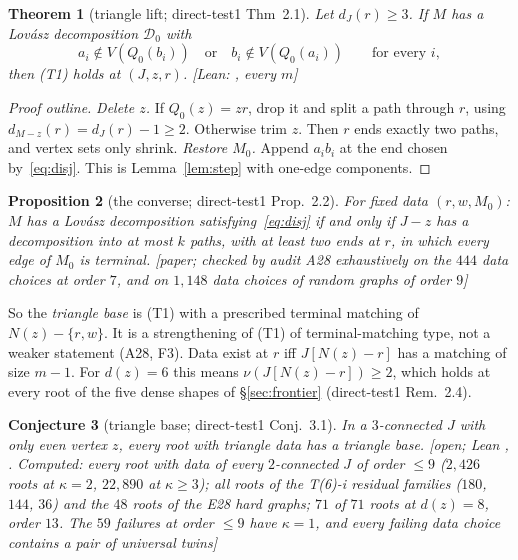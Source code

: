 \documentclass[11pt]{amsart}
\newtheorem{theorem}{Theorem}[section]
\newtheorem{proposition}[theorem]{Proposition}
\newtheorem{conjecture}[theorem]{Conjecture}
\theoremstyle{definition}
\newcommand{\st}[1]{\textsf{\small[#1]}}
\newcommand{\cD}{\mathcal D}
\begin{document}
\begin{theorem}[triangle lift; direct-test1 Thm~2.1]\label{thm:tri}
Let $d_J(r)\ge3$. If $M$ has a Lov\'asz decomposition $\cD_0$ with
\begin{equation}\label{eq:disj}
a_i\notin V(Q_0(b_i))\quad\text{or}\quad b_i\notin V(Q_0(a_i))\qquad\text{for every } i,
\end{equation}
then (T1) holds at $(J,z,r)$. \st{Lean: , every $m$}
\end{theorem}

\begin{proof}[Proof outline]
\emph{Delete $z$.} If $Q_0(z)=zr$, drop it and split a path through $r$, using
$d_{M-z}(r)=d_J(r)-1\ge2$. Otherwise trim $z$. Then $r$ ends exactly two paths, and vertex sets only
shrink. \emph{Restore $M_0$.} Append $a_ib_i$ at the end chosen by~\eqref{eq:disj}. This is
Lemma~\ref{lem:step} with one-edge components.
\end{proof}

\begin{proposition}[the converse; direct-test1 Prop.~2.2]\label{prop:triconv}
For fixed data $(r,w,M_0)$: $M$ has a Lov\'asz decomposition satisfying~\eqref{eq:disj} if and only if
$J-z$ has a decomposition into at most $k$ paths, with at least two ends at $r$, in which every edge of
$M_0$ is terminal. \st{paper; checked by audit A28 exhaustively on the $444$ data choices at order $7$, and on
$1{,}148$ data choices of random graphs of order $9$}
\end{proposition}

So the \emph{triangle base} is (T1) with a prescribed terminal matching of $N(z)-\{r,w\}$. It is a
strengthening of (T1) of terminal-matching type, not a weaker statement (A28, F3). Data exist at $r$ iff
$J[N(z)-r]$ has a matching of size $m-1$. For $d(z)=6$ this means $\nu(J[N(z)-r])\ge2$, which holds at
every root of the five dense shapes of \S\ref{sec:frontier} (direct-test1 Rem.~2.4).

\begin{conjecture}[triangle base; direct-test1 Conj.~3.1]\label{conj:tri}
In a $3$-connected $J$ with only even vertex $z$, every root with triangle data has a triangle base.
\st{open; Lean , \lean{test1_of_triangleBaseConj}. Computed: every root with
data of every $2$-connected $J$ of order $\le9$ ($2{,}426$ roots at $\kappa=2$, $22{,}890$ at
$\kappa\ge3$); all roots of the T(6)-i residual families ($180$, $144$, $36$) and the $48$ roots of the
E28 hard graphs; $71$ of $71$ roots at $d(z)=8$, order $13$. The $59$ failures at order $\le 9$ have
$\kappa=1$, and every failing data choice contains a pair of universal twins}
\end{conjecture}
\end{document}

